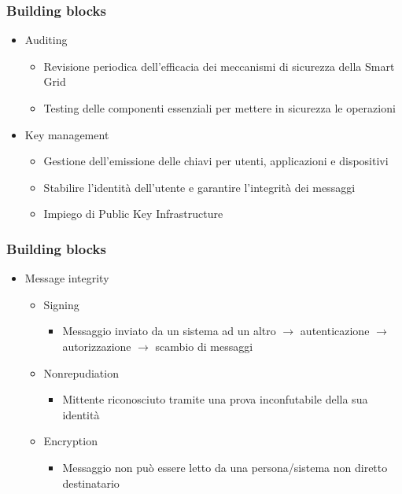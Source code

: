 \begin{frame}
  \frametitle{Building blocks}
  \begin{itemize}[<+- | alert@+>]
  \item Auditing
  \begin{itemize}
  \item Revisione periodica dell'efficacia dei meccanismi di sicurezza della Smart Grid
  \item Testing delle componenti essenziali per mettere in sicurezza le operazioni
  \end{itemize}
 \item Key management
 	\begin{itemize}
 		\item Gestione dell'emissione delle chiavi per utenti, applicazioni e dispositivi
 		\item Stabilire l'identità dell'utente e garantire l'integrità dei messaggi
 		\item Impiego di Public Key Infrastructure
 	\end{itemize}
  \end{itemize}
\end{frame}

\begin{frame}
  \frametitle{Building blocks}
  \begin{itemize}[<+- | alert@+>]
  \item Message integrity
  \begin{itemize}
  \item Signing
  	\begin{itemize}
  	\item Messaggio inviato da un sistema ad un altro $\rightarrow$ autenticazione $\rightarrow$ autorizzazione $\rightarrow$ scambio di messaggi
  	\end{itemize}
  \item Nonrepudiation
    \begin{itemize}
  	\item Mittente riconosciuto tramite una prova inconfutabile della sua identità
  	\end{itemize}
  \item Encryption
    \begin{itemize}
  	\item Messaggio non può essere letto da una persona/sistema non diretto destinatario
  	\end{itemize}
 	\end{itemize}
  \end{itemize}
\end{frame}

